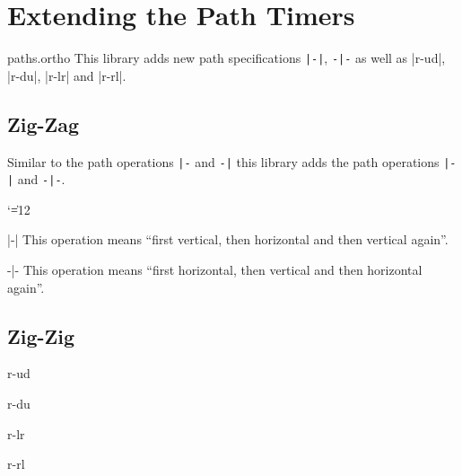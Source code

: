 %
%
%

\section{Extending the Path Timers}
\label{library:paths.ortho}

\begin{tikzlibrary}{paths.ortho}
  This library adds new path specifications \verb!|-|!, \verb!-|-! as well as
  |r-ud|, |r-du|, |r-lr| and |r-rl|.
\end{tikzlibrary}

\subsection{Zig-Zag}
Similar to the path operations \verb!|-! and \verb!-|! this library adds
the path operations \verb!|-|! and \verb!-|-!.
{\catcode`\|=12
\begin{pathoperation}[noindex]{|-|}{}
    \pgfmanualpdflabel[\catcode`\|=12 ]{|-|}{}%
    This operation means ``first vertical, then horizontal and then vertical again''.
\end{pathoperation}
\begin{pathoperation}[noindex]{-|-}{}
    \pgfmanualpdflabel[\catcode`\|=12 ]{-|-}{}%
    This operation means ``first horizontal, then vertical and then horizontal again''.
\end{pathoperation}
}
\subsection{Zig-Zig}
\begin{pathoperation}{r-ud}{}
\end{pathoperation}
\begin{pathoperation}{r-du}{}
\end{pathoperation}
\begin{pathoperation}{r-lr}{}
\end{pathoperation}
\begin{pathoperation}{r-rl}{}
\end{pathoperation}